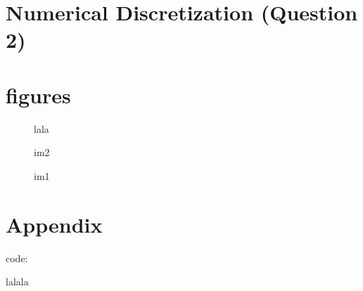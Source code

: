 \documentclass[conference]{IEEEtran}
\begin{document}
\section{Numerical Discretization (Question 2)}


\section{figures}

\begin{figure}[!ht]
\centering 
\caption{lala}
\label{fig:fig7}
\end{figure}

\begin{figure}[!ht]
\centering 
\begin{minipage}[t]{4cm} 
\centering 
\caption{im2} 
\label{fig:fig8}
\end{minipage} 
\begin{minipage}[t]{4cm} 
\centering 
\caption{im1}
\label{fig:fig9}
\end{minipage} 
\end{figure}


\section{Appendix}\label{sec:appendix}
code: 

\begin{thebibliography}{1}

lalala

\end{thebibliography}
\end{document}
